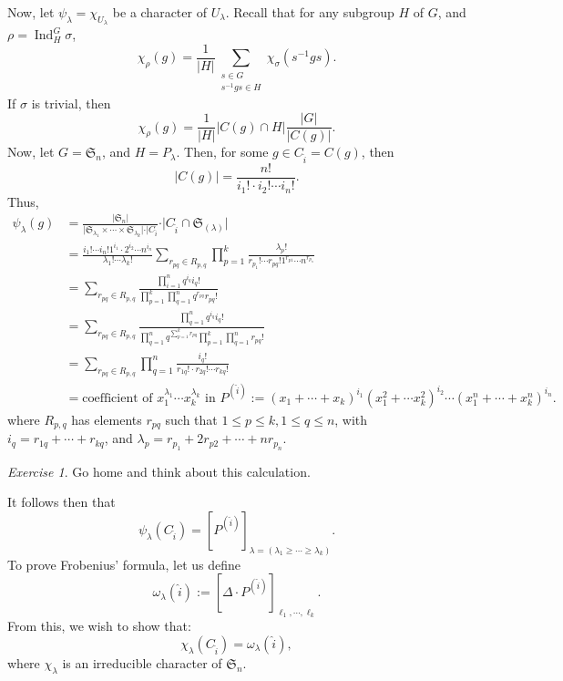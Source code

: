 \documentclass[a4paper]{report}
\theoremstyle{definition}
\theoremstyle{remark}
\theoremstyle{proposition}
\theoremstyle{conjecture}
\theoremstyle{lemma}
\theoremstyle{corollary}
\theoremstyle{exercise}
\newtheorem{exercise}{Exercise}
\theoremstyle{example}
\newcommand{\on}{\operatorname}
\begin{document}
Now, let $\psi_\lambda = \chi_{U_\lambda}$ be a character of $U_\lambda$.
Recall that for any subgroup $H$ of $G$, and $\rho = \on{Ind}_H^G\sigma$,
$$\chi_\rho(g) = \frac{1}{\vert H\vert} \sum_{\substack{s\in G\\ s^{-1}gs\in H}}\chi_\sigma(s^{-1} gs).$$
If $\sigma$ is trivial, then $$\chi_\rho(g) = \frac{1}{\vert H\vert} \vert C(g)\cap H\vert \frac{\vert G\vert}{\vert C(g)\vert}.$$
Now, let $G = \mathfrak{S}_n$, and $H = P_\lambda$. Then, for some $g\in C_{\widehat{i}} = C(g)$, then
$$\vert C(g)\vert = \frac{n!}{i_1!\cdot  i_2!\cdots i_n!}.$$
Thus,
\begin{align*}
    \psi_\lambda(g) &= \frac{\vert\mathfrak{S}_n\vert}{\vert \mathfrak{S}_{\lambda_1}\times \cdots\times \mathfrak{S}_{\lambda_k}\vert \cdot \vert C_{\widehat{i}}} \cdot \vert C_{\widehat{i}} \cap \mathfrak{S}_{(\lambda)}\vert \\
                    &= \frac{i_1! \cdots i_n! 1^{i_1}\cdot 2^{i_2}\cdots n^{i_n}}{\lambda_1! \cdots \lambda_k!} \sum_{r_{pq}\in R_{p,q}}\prod_{p=1}^k\frac{\lambda_p!}{r_{p_1}! \cdots r_{pq}! 1^{r_{p1}} \cdots n^{r_{p_n}}}\\
                    &= \sum_{r_{pq}\in R_{p,q}} \frac{\prod_{i=1}^nq^{i_q}i_q!}{\prod_{p=1}^k \prod_{q=1}^n q^{r_{pq}} r_{pq}!}\\
                    &= \sum_{r_{pq}\in R_{p,q}} \frac{\prod_{q=1}^n q^{i_q}i_q!}{\prod_{q=1}^n q^{\sum_{p=1}^k r_{pq}} \prod_{p=1}^k \prod_{q=1}^nr_{pq}!}\\
                    &= \sum_{r_{pq}\in R_{p,q}} \prod_{q=1}^n \frac{i_q!}{r_{1q}! \cdot r_{2q}! \cdots r_{kq}!}\\
                    &= \text{coefficient of $x_1^{\lambda_1}\cdots x_k^{\lambda_k}$ in $P^{(\widehat{i})} := (x_1 + \cdots + x_k)^{i_1} (x_1^2+\cdots x_k^2)^{i_2} \cdots (x_1^n+\cdots +x_k^n)^{i_n}$.}
\end{align*}
where $R_{p,q}$ has elements $r_{pq}$ such that $1\leq p \leq k, 1\leq q \leq n$,
with $i_q = r_{1q}+\cdots + r_{kq}$, and $\lambda_p = r_{p_1} + 2 r_{p2} + \cdots + nr_{p_n}$. 

\begin{exercise}
    Go home and think about this calculation.
\end{exercise}

It follows then that 
$$\psi_\lambda (C_{\widehat{i}}) = \left[ P^{(\widehat{i})}\right]_{\lambda = (\lambda_1 \geq \cdots \geq \lambda_k)}.$$
To prove Frobenius' formula, let us define 
$$\omega_\lambda(\widehat{i}) := \left[ \Delta \cdot P^{(\widehat{i})}\right]_{\ell_1,\cdots,\ell_k}.$$
From this, we wish to show that:
$$\chi_\lambda(C_{\widehat{i}}) = \omega_\lambda(\widehat{i}),$$
where $\chi_\lambda$ is an irreducible character of $\mathfrak{S}_n$.
\end{document}
